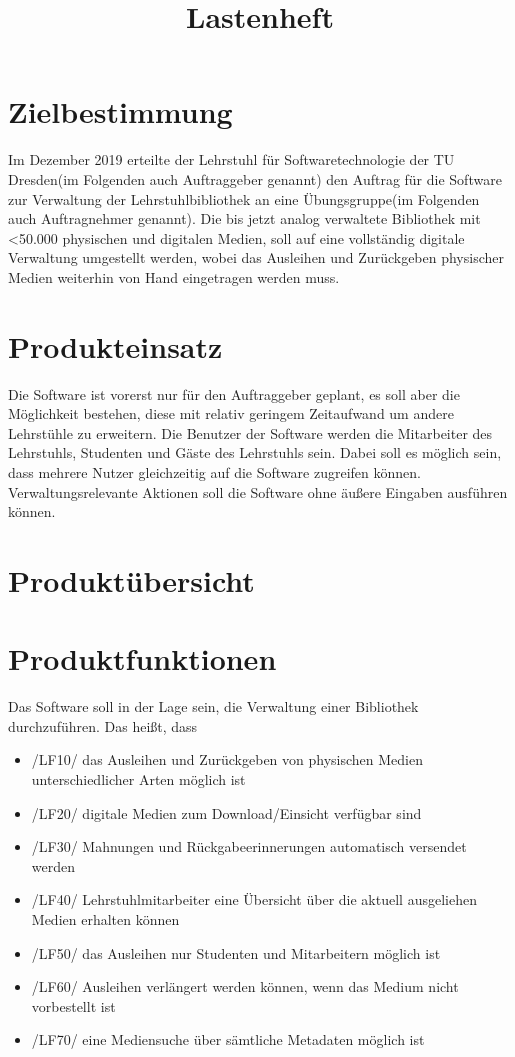 \documentclass[12pt, a4paper]{article}
\title{Lastenheft}
\begin{document}
\maketitle
\pagebreak
\tableofcontents
\pagebreak

\section{Zielbestimmung}

Im Dezember 2019 erteilte der Lehrstuhl für Softwaretechnologie der TU Dresden(im Folgenden auch Auftraggeber genannt) den Auftrag für die Software zur Verwaltung der Lehrstuhlbibliothek an eine Übungsgruppe(im Folgenden auch Auftragnehmer genannt). Die bis jetzt analog verwaltete Bibliothek mit <50.000 physischen und digitalen Medien, soll auf eine vollständig digitale Verwaltung umgestellt werden, wobei das Ausleihen und Zurückgeben physischer Medien weiterhin von Hand eingetragen werden muss.

\section{Produkteinsatz}
Die Software ist vorerst nur für den Auftraggeber geplant, es soll aber die Möglichkeit bestehen, diese mit relativ geringem Zeitaufwand um andere Lehrstühle zu erweitern.
Die Benutzer der Software werden die Mitarbeiter des Lehrstuhls, Studenten und Gäste des Lehrstuhls sein. Dabei soll es möglich sein, dass mehrere Nutzer gleichzeitig auf die Software zugreifen können. Verwaltungsrelevante Aktionen soll die Software ohne äußere Eingaben ausführen können. 

\section{Produktübersicht}
\section{Produktfunktionen}
Das Software soll in der Lage sein, die Verwaltung einer Bibliothek durchzuführen. Das heißt, dass
\begin{itemize}
	\item /LF10/ das Ausleihen und Zurückgeben von physischen Medien unterschiedlicher Arten möglich ist
	\item /LF20/ digitale Medien zum Download/Einsicht verfügbar sind
	\item /LF30/ Mahnungen und Rückgabeerinnerungen automatisch versendet werden
	\item /LF40/ Lehrstuhlmitarbeiter eine Übersicht über die aktuell ausgeliehen Medien erhalten können 
	\item /LF50/ das Ausleihen nur Studenten und Mitarbeitern möglich ist
	\item /LF60/ Ausleihen verlängert werden können, wenn das Medium nicht vorbestellt ist
	\item /LF70/ eine Mediensuche über sämtliche Metadaten möglich ist
\end{itemize}
\end{document}
